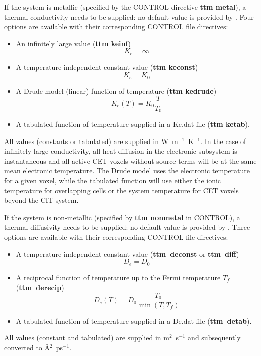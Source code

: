 If the system is metallic (specified by the CONTROL directive {\bf ttm metal}),
a thermal conductivity
needs to be supplied: no default value is provided by \D.
Four options are available with their corresponding CONTROL file directives:
\begin{itemize}
\item An infinitely large value ({\bf ttm keinf}) \begin{equation*}K_e = \infty\end{equation*}
\item A temperature-independent constant value  ({\bf ttm keconst}) \begin{equation*}K_e = K_0\end{equation*}
\item A Drude-model (linear) function of temperature ({\bf ttm kedrude}) \begin{equation*}K_e (T) = K_0 \frac{T}{T_0}\end{equation*}
\item A tabulated function of temperature supplied in a Ke.dat file ({\bf ttm ketab}).
\end{itemize}
All values (constants or tabulated) are supplied in W~m$^{-1}$~K$^{-1}$.
In the case of infinitely large conductivity, all heat diffusion in the electronic
subsystem is instantaneous and all active CET voxels without source terms
will be at the same mean electronic temperature. The Drude model uses the
electronic temperature for a given voxel, while the tabulated function will use
either the ionic temperature for overlapping cells or the system temperature
for CET voxels beyond the CIT system.

If the system is non-metallic (specified by {\bf ttm nonmetal} in CONTROL),
a thermal diffusivity
needs to be supplied: no default value is provided by \D.
Three options are available with their corresponding CONTROL file directives:
\begin{itemize}
\item A temperature-independent constant value ({\bf ttm~deconst} or {\bf ttm~diff}) \begin{equation*}D_e = D_0\end{equation*}
\item A reciprocal function of temperature up to the Fermi temperature $T_{f}$ ({\bf ttm~derecip}) \begin{equation*}D_e (T) = D_0 \frac{T_0}{\min \left(T, T_{f}\right)}\end{equation*}
\item A tabulated function of temperature supplied in a De.dat file ({\bf ttm~detab}).
\end{itemize}
All values (constant and tabulated) are supplied in m$^2$~s$^{-1}$ and
subsequently converted to \AA$^2$~ps$^{-1}$.

